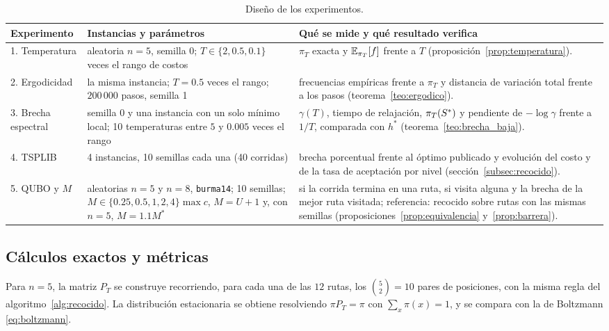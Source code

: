\begin{table}[H]
\centering
\small
\begin{tabular}{@{}p{2.8cm}p{4.3cm}p{6.4cm}@{}}
\toprule
Experimento & Instancias y parámetros & Qué se mide y qué resultado verifica \\
\midrule
1. Temperatura & aleatoria \(n=5\), semilla 0; \(T\in\{2,0.5,0.1\}\) veces el rango de costos &
\(\pi_T\) exacta y \(\mathbb{E}_{\pi_T}[f]\) frente a \(T\)
(proposición~\ref{prop:temperatura}). \\[0.5ex]
2. Ergodicidad & la misma instancia; \(T=0.5\) veces el rango; \(200\,000\) pasos, semilla 1 &
frecuencias empíricas frente a \(\pi_T\) y distancia de variación
total frente a los pasos (teorema~\ref{teo:ergodico}). \\[0.5ex]
3. Brecha espectral & semilla 0 y una instancia con un solo mínimo
local; 10 temperaturas entre \(5\) y \(0.005\) veces el rango &
\(\gamma(T)\), tiempo de relajación, \(\pi_T(S^{\ast})\) y pendiente de
\(-\log\gamma\) frente a \(1/T\), comparada con \(h^\ast\)
(teorema~\ref{teo:brecha_baja}). \\[0.5ex]
4. TSPLIB & 4 instancias, 10 semillas cada una (40 corridas) &
brecha porcentual frente al óptimo publicado y evolución del costo y de
la tasa de aceptación por nivel (sección~\ref{subsec:recocido}). \\[0.5ex]
5. QUBO y \(M\) & aleatorias \(n=5\) y \(n=8\), \texttt{burma14}; 10
semillas; \(M\in\{0.25,0.5,1,2,4\}\max c\), \(M=U+1\) y, con \(n=5\),
\(M=1.1M^\ast\) &
si la corrida termina en una ruta, si visita alguna y la brecha de la
mejor ruta visitada; referencia: recocido sobre rutas con las mismas
semillas (proposiciones~\ref{prop:equivalencia} y~\ref{prop:barrera}). \\
\bottomrule
\end{tabular}
\caption{Diseño de los experimentos.}
\label{tab:experimentos}
\end{table}

\subsection{Cálculos exactos y métricas}
\label{subsec:metricas}

Para \(n=5\), la matriz \(P_T\) se construye recorriendo, para cada una
de las \(12\) rutas, los \(\binom52=10\) pares de posiciones, con la
misma regla del algoritmo~\ref{alg:recocido}. La distribución
estacionaria se obtiene resolviendo \(\pi P_T=\pi\) con
\(\sum_x\pi(x)=1\), y se compara con la de Boltzmann \eqref{eq:boltzmann}.

